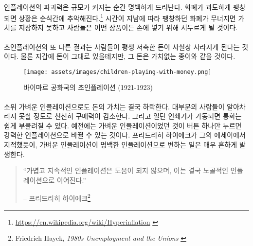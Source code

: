 \paragraph{}
인플레이션의 파괴력은 규모가 커지는 순간 명백하게 드러난다. 
화폐가 과도하게 팽창되면 상황은 순식간에 추악해진다.\footnote{\url{https://en.wikipedia.org/wiki/Hyperinflation} \cite{wiki:hyperinflation}} 
시간이 지남에 따라 팽창하던 화폐가 무너지면 가치를 저장하지 못하고 
사람들은 어떤 상품이든 손에 넣기 위해 서두르게 될 것이다.

\paragraph{}
초인플레이션의 또 다른 결과는 사람들이 평생 저축한 돈이 사실상 사라지게 된다는 것이다. 
물론 지갑에 돈이 그대로 있을테지만, 그 돈은 가치없는 종이와 같을 것이다.

\begin{figure}
	\texttt{[image: assets/images/children-playing-with-money.png]}
	\caption{바이마르 공화국의 초인플레이션 (1921-1923)}
	\label{fig:children-playing-with-money}
\end{figure}

\paragraph{}
소위 가벼운 인플레이션으로도 돈의 가치는 결국 하락한다. 
대부분의 사람들이 알아차리지 못할 정도로 천천히 구매력이 감소한다. 
그리고 일단 인쇄기가 가동되면 통화는 쉽게 부풀려질 수 있다. 예전에는 가벼운 인플레이션이었던 것이
버튼 하나만 누르면 강력한 인플레이션으로 바뀔 수 있는 것이다.
프리드리히 하이에크가 그의 에세이에서 지적했듯이, 가벼운 인플레이션이 명백한 인플레이션으로 변하는 일은 매우 흔하게 발생한다.

\begin{quotation}\begin{samepage}
		\enquote{가볍고 지속적인 인플레이션은 도움이 되지 않으며, 이는 결국 노골적인 인플레이션으로 이어진다.}
		\begin{flushright} -- 프리드리히 하이에크\footnote{Friedrich Hayek, \textit{1980s
					Unemployment and the Unions} \cite{hayek-inflation}}
\end{flushright}\end{samepage}\end{quotation}

